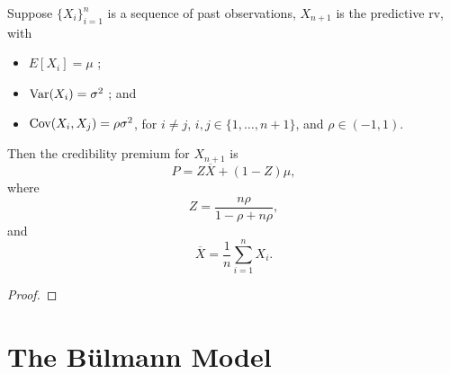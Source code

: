 \documentclass[notoc,notitlepage]{tufte-book}
\begin{document}
\begin{thm}[Theorem 1]\label{thm:theorem_1}
  Suppose $\{ X_i \}_{i=1}^n$ is a sequence of past observations, $X_{n+1}$ is
  the predictive rv, with
  \begin{itemize}
    \item $E[X_i] = \mu$ ;
    \item $\operatorname{Var}(X_i) = \sigma^2$ ; and
    \item $\operatorname{Cov}(X_i, X_j) = \rho \sigma^2$, for $i \neq j$, $i, j \in \{ 1,
      \ldots, n+1 \}$, and $\rho \in (-1, 1)$.
  \end{itemize}
  Then the credibility premium for $X_{n+1}$ is
  \begin{equation*}
    P = Z \overline{X} + (1 - Z) \mu,
  \end{equation*}
  where
  \begin{equation*}
    Z = \frac{n\rho}{1 - \rho + n\rho},
  \end{equation*}
  and
  \begin{equation*}
    \overline{X} = \frac{1}{n} \sum_{i=1}^{n} X_i.
  \end{equation*}
\end{thm}

\begin{proof}
\end{proof}


\section{The B\"{u}lmann Model}%
\label{sec:the_buhlmann_model}





\appendix

\backmatter

\fancyhead[LE]{\thepage \enspace \textsl{\leftmark}}



\printindex
\end{document}
